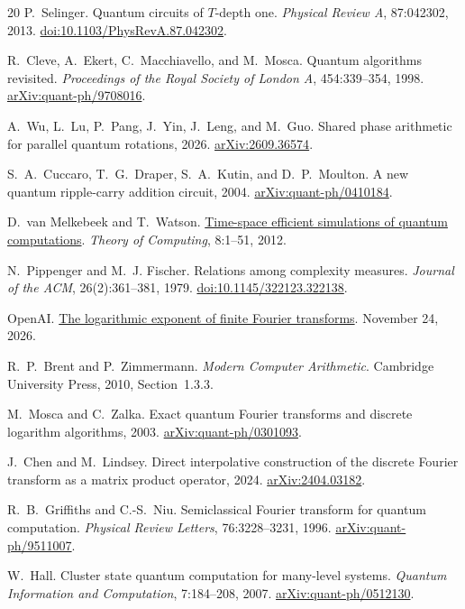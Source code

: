 \documentclass[11pt]{article}
\newcommand{\arx}[1]{\href{https://arxiv.org/abs/#1}{arXiv:#1}}
\newcommand{\oaipaper}[2]{\href{https://github.com/openai/math/blob/main/preprints/#1-November-24-2026/paper.pdf}{#2}}
\begin{document}
\begin{thebibliography}{20}
P.~Selinger.
Quantum circuits of $T$-depth one.
\emph{Physical Review A}, 87:042302, 2013.
\href{https://doi.org/10.1103/PhysRevA.87.042302}{doi:10.1103/PhysRevA.87.042302}.

R.~Cleve, A.~Ekert, C.~Macchiavello, and M.~Mosca.
Quantum algorithms revisited.
\emph{Proceedings of the Royal Society of London A}, 454:339--354, 1998.
\arx{quant-ph/9708016}.

A.~Wu, L.~Lu, P.~Pang, J.~Yin, J.~Leng, and M.~Guo.
Shared phase arithmetic for parallel quantum rotations, 2026.
\arx{2609.36574}.

S.~A.~Cuccaro, T.~G.~Draper, S.~A.~Kutin, and D.~P.~Moulton.
A new quantum ripple-carry addition circuit, 2004.
\arx{quant-ph/0410184}.

D.~van Melkebeek and T.~Watson.
\href{https://theoryofcomputing.org/articles/v008a001/}{Time-space efficient simulations of quantum computations}.
\emph{Theory of Computing}, 8:1--51, 2012.

N.~Pippenger and M.~J. Fischer.
Relations among complexity measures.
\emph{Journal of the ACM}, 26(2):361--381, 1979.
\href{https://doi.org/10.1145/322123.322138}{doi:10.1145/322123.322138}.

OpenAI.
\oaipaper{The-logarithmic-exponent-of-finite-Fourier-transforms}{The logarithmic exponent of finite Fourier transforms}.
November 24, 2026.

R.~P.~Brent and P.~Zimmermann.
\emph{Modern Computer Arithmetic}.
Cambridge University Press, 2010, Section~1.3.3.

M.~Mosca and C.~Zalka.
Exact quantum Fourier transforms and discrete logarithm algorithms, 2003.
\arx{quant-ph/0301093}.

J.~Chen and M.~Lindsey.
Direct interpolative construction of the discrete Fourier transform as a matrix product operator, 2024.
\arx{2404.03182}.

R.~B.~Griffiths and C.-S.~Niu.
Semiclassical Fourier transform for quantum computation.
\emph{Physical Review Letters}, 76:3228--3231, 1996.
\arx{quant-ph/9511007}.

W.~Hall.
Cluster state quantum computation for many-level systems.
\emph{Quantum Information and Computation}, 7:184--208, 2007.
\arx{quant-ph/0512130}.

\end{thebibliography}
\end{document}
